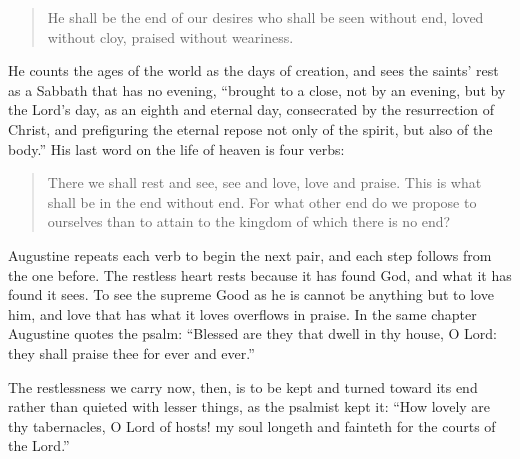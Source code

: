 \begin{quote}
He shall be the end of our desires who shall be seen without end, loved without cloy, praised without weariness.
\end{quote}

He counts the ages of the world as the days of creation, and sees the saints' rest as a Sabbath that has no evening, ``brought to a close, not by an evening, but by the Lord's day, as an eighth and eternal day, consecrated by the resurrection of Christ, and prefiguring the eternal repose not only of the spirit, but also of the body.'' His last word on the life of heaven is four verbs:

\begin{quote}
There we shall rest and see, see and love, love and praise. This is what shall be in the end without end. For what other end do we propose to ourselves than to attain to the kingdom of which there is no end?
\end{quote}

Augustine repeats each verb to begin the next pair, and each step follows from the one before. The restless heart rests because it has found God, and what it has found it sees. To see the supreme Good as he is cannot be anything but to love him, and love that has what it loves overflows in praise. In the same chapter Augustine quotes the psalm: ``Blessed are they that dwell in thy house, O Lord: they shall praise thee for ever and ever.''

The restlessness we carry now, then, is to be kept and turned toward its end rather than quieted with lesser things, as the psalmist kept it: ``How lovely are thy tabernacles, O Lord of hosts! my soul longeth and fainteth for the courts of the Lord.''
